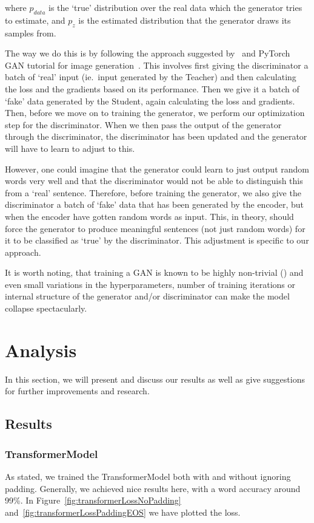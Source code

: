 \documentclass{article}
\begin{document}
where $p_{data}$ is the `true' distribution over the real data which the
generator tries to estimate, and $p_z$ is the estimated distribution that the
generator draws its samples from.

The way we do this is by following the approach suggested
by~\cite{Goodfellow2014GenerativeAN} and PyTorch GAN tutorial for image
generation~\cite{pytorchTutorialGAN}. This involves first giving the
discriminator a batch of `real' input (ie.\ input generated by the Teacher) and
then calculating the loss and the gradients based on its performance. Then we
give it a batch of `fake' data generated by the Student, again calculating the
loss and gradients. Then, before we move on to training the generator, we
perform our optimization step for the discriminator. When we then pass the
output of the generator through the discriminator, the discriminator has been
updated and the generator will have to learn to adjust to this. 

However, one could imagine that the generator could learn to just output random
words very well and that the discriminator would not be able to distinguish this
from a `real' sentence. Therefore, before training the generator, we also give
the discriminator a batch of `fake' data that has been generated by the encoder,
but when the encoder have gotten random words as input. This, in theory, should
force the generator to produce meaningful sentences (not just random words) for
it to be classified as `true' by the discriminator. This adjustment is specific to
our approach.

It is worth noting, that training a GAN is known to be highly non-trivial
(\cite{Hui2018}) and even small variations in the hyperparameters, number of training
iterations or internal structure of the generator and/or discriminator can make
the model collapse spectacularly.

\section{Analysis}\label{sec:analysis}

In this section, we will present and discuss our results as well as give
suggestions for further improvements and research.

\subsection{Results}\label{sec:results}

\subsubsection{TransformerModel}
As stated, we trained the TransformerModel both with and without ignoring
padding. Generally, we achieved nice results here, with a word accuracy around
99\%. In Figure~\ref{fig:transformerLossNoPadding}
and~\ref{fig:transformerLossPaddingEOS} we have plotted the loss.
\end{document}
